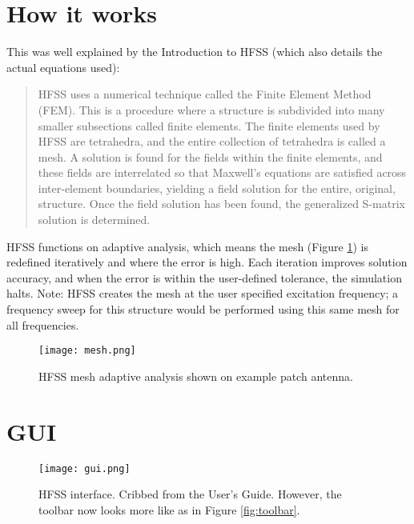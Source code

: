 \documentclass[11pt]{article}
\begin{document}

\section{How it works}

This was well explained by the Introduction to HFSS (which also details the actual equations used): 

\blockquote{HFSS uses a numerical technique called the Finite Element Method (FEM). This is a procedure where a structure is subdivided into many smaller subsections called finite elements. The finite elements used by HFSS are tetrahedra, and the entire collection of tetrahedra is called a mesh. A solution is found for the fields within the finite elements, and these fields are interrelated so that Maxwell’s equations are satisfied across inter-element boundaries, yielding a field solution for the entire, original, structure. Once the field solution has been found, the generalized S-matrix solution is determined.}

HFSS functions on adaptive analysis, which means the mesh (Figure \ref{fig:mesh}) is redefined iteratively and where the error is high. Each iteration improves solution accuracy, and when the error is within the user-defined tolerance, the simulation halts. Note: HFSS creates the mesh at the user specified excitation frequency; a frequency sweep for this structure would be performed using this same mesh for all frequencies.

\begin{figure}[H]
	\centering
	\texttt{[image: mesh.png]}
	\caption{HFSS mesh adaptive analysis shown on example patch antenna.}
	\label{fig:mesh}
\end{figure}



\section{GUI}

\begin{figure}[H]
	\centering
	\texttt{[image: gui.png]}
	\caption{HFSS interface. Cribbed from the User's Guide. However, the toolbar now looks more like as in Figure \ref{fig:toolbar}.}
	\label{fig:gui}
\end{figure}
\end{document}
